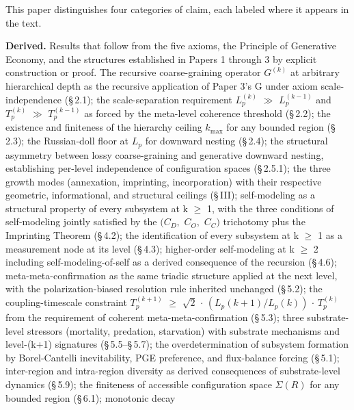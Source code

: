 \documentclass[11pt,oneside]{report}
\theoremstyle{definition}
\theoremstyle{remark}
\begin{document}
This paper distinguishes four categories of claim, each labeled where it
appears in the text.

\textbf{Derived.} Results that follow from the five axioms, the
Principle of Generative Economy, and the structures established in
Papers 1 through 3 by explicit construction or proof. The recursive
coarse-graining operator \ensuremath{G^{(k)}} at arbitrary hierarchical depth as the
recursive application of Paper 3's G under axiom scale-independence
(\S\,2.1); the scale-separation requirement \ensuremath{L_{p}^{(k)}} \ensuremath{\gg} \ensuremath{L_{p}^{(k-1)}} and
\ensuremath{T_{p}^{(k)}} \ensuremath{\gg} \ensuremath{T_{p}^{(k-1)}} as forced by the meta-level coherence
threshold (\S\,2.2); the existence and finiteness of the hierarchy ceiling
\ensuremath{k_{\mathrm{max}}} for any bounded region (\S\,2.3); the Russian-doll floor at \ensuremath{L_{p}} for
downward nesting (\S\,2.4); the structural asymmetry between lossy
coarse-graining and generative downward nesting, establishing per-level
independence of configuration spaces (\S\,2.5.1); the three growth modes
(annexation, imprinting, incorporation) with their respective geometric,
informational, and structural ceilings (\S\,III); self-modeling as a
structural property of every subsystem at k \ensuremath{\geq} 1, with the three
conditions of self-modeling jointly satisfied by the \ensuremath{(C_{D},} \ensuremath{C_{O},} \ensuremath{C_{C})}
trichotomy plus the Imprinting Theorem (\S\,4.2); the identification of
every subsystem at k \ensuremath{\geq} 1 as a measurement node at its level (\S\,4.3);
higher-order self-modeling at k \ensuremath{\geq} 2 including self-modeling-of-self as a
derived consequence of the recursion (\S\,4.6); meta-meta-confirmation as
the same triadic structure applied at the next level, with the
polarization-biased resolution rule inherited unchanged (\S\,5.2); the
coupling-timescale constraint \ensuremath{T_{p}^{(k+1)}} \ensuremath{\geq} \ensuremath{\sqrt{2}} \ensuremath{\cdot} \ensuremath{(L_{p}(k+1)/L_{p}(k))} \ensuremath{\cdot}
\ensuremath{T_{p}^{(k)}} from the requirement of coherent meta-meta-confirmation
(\S\,5.3); three substrate-level stressors (mortality, predation,
starvation) with substrate mechanisms and level-(k+1) signatures
(\S\,5.5--\S\,5.7); the overdetermination of subsystem formation by
Borel-Cantelli inevitability, PGE preference, and flux-balance forcing
(\S\,5.1); inter-region and intra-region diversity as derived consequences
of substrate-level dynamics (\S\,5.9); the finiteness of accessible
configuration space \ensuremath{\Sigma (R)} for any bounded region (\S\,6.1); monotonic decay
\end{document}

